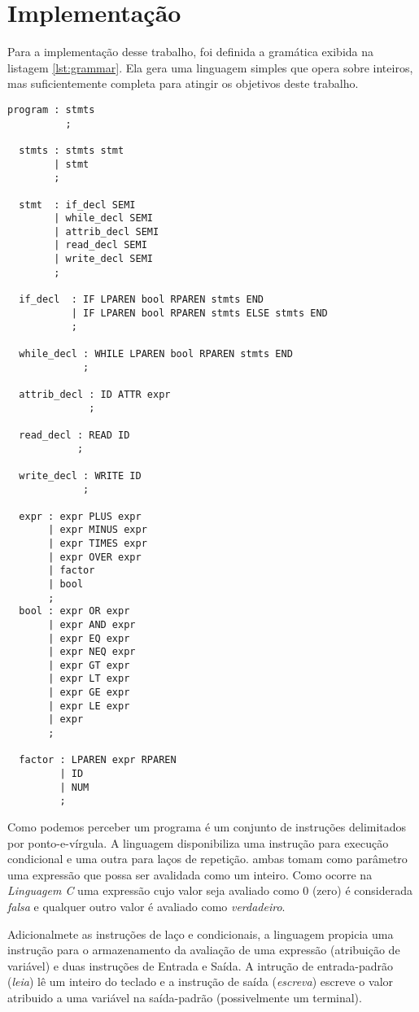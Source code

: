 \section{Implementação}
\label{sec:implementacao}

Para a implementação desse trabalho, foi definida a gramática exibida na
listagem \ref{lst:grammar}. Ela gera uma linguagem simples que opera sobre
inteiros, mas suficientemente completa para atingir os objetivos deste
trabalho.
\begin{lstlisting}[label=lst:grammar,caption=Gramática reconhecida]
  program : stmts
          ;

  stmts : stmts stmt
        | stmt
        ;

  stmt  : if_decl SEMI
        | while_decl SEMI
        | attrib_decl SEMI
        | read_decl SEMI
        | write_decl SEMI
        ;

  if_decl  : IF LPAREN bool RPAREN stmts END
           | IF LPAREN bool RPAREN stmts ELSE stmts END
           ;

  while_decl : WHILE LPAREN bool RPAREN stmts END
             ;

  attrib_decl : ID ATTR expr
              ;

  read_decl : READ ID
            ;

  write_decl : WRITE ID
             ;

  expr : expr PLUS expr
       | expr MINUS expr
       | expr TIMES expr
       | expr OVER expr
       | factor
       | bool
       ;
  bool : expr OR expr
       | expr AND expr
       | expr EQ expr
       | expr NEQ expr
       | expr GT expr
       | expr LT expr
       | expr GE expr
       | expr LE expr
       | expr
       ;

  factor : LPAREN expr RPAREN
         | ID
         | NUM
         ;
\end{lstlisting}

Como podemos perceber um programa é um conjunto de instruções delimitados por
ponto-e-vírgula. A linguagem disponibiliza uma instrução para execução
condicional e uma outra para laços de repetição. ambas tomam como parâmetro
uma expressão que possa ser avalidada como um inteiro. Como ocorre na
\emph{Linguagem C} uma expressão cujo valor seja avaliado como 0 (zero) é
considerada \emph{falsa} e qualquer outro valor é avaliado como
\emph{verdadeiro}.

Adicionalmete as instruções de laço e condicionais, a linguagem propicia uma
instrução para o armazenamento da avaliação de uma expressão (atribuição de
variável) e duas instruções de Entrada e Saída. A intrução de entrada-padrão
(\emph{leia}) lê um inteiro do teclado e a instrução de saída (\emph{escreva})
escreve o valor atribuido a uma variável na saída-padrão (possivelmente um
terminal).

